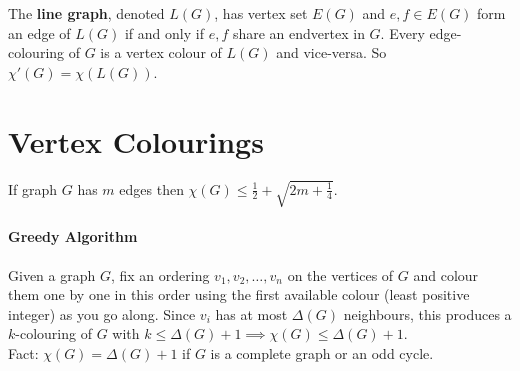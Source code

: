 The \textbf{line graph}, denoted \(L(G)\), has vertex set \(E(G)\) and \(e, f \in E(G)\) form an edge of \(L(G)\) if and only if \(e, f\) share an endvertex in \(G\). Every edge-colouring of \(G\) is a vertex colour of \(L(G)\) and vice-versa. So \(\chi'(G) = \chi(L(G))\).

\section{Vertex Colourings}

\begin{proposition}
    If graph \(G\) has \(m\) edges then \(\chi(G) \leq \frac{1}{2} + \sqrt{2m + \frac{1}{4}}\).
\end{proposition}

\paragraph{Greedy Algorithm} Given a graph \(G\), fix an ordering \(v_1, v_2, \dots, v_n\) on the vertices of \(G\) and colour them one by one in this order using the first available colour (least positive integer) as you go along. Since \(v_i\) has at most \(\Delta(G)\) neighbours, this produces a \(k\)-colouring of \(G\) with \(k \leq \Delta(G) + 1 \implies \chi(G) \leq \Delta(G) + 1\). \\

Fact: \(\chi(G) = \Delta(G) + 1\) if \(G\) is a complete graph or an odd cycle.

